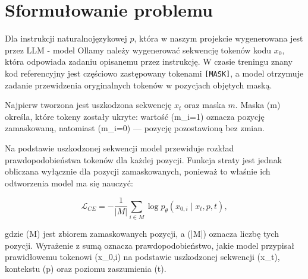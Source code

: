 \section{Sformułowanie problemu}
\label{sec:problem}

Dla instrukcji naturalnojęzykowej $p$, która w naszym projekcie wygenerowana jest przez LLM - model Ollamy należy wygenerować sekwencję tokenów kodu $x_0$, która odpowiada zadaniu opisanemu przez instrukcję.
W czasie treningu znany kod referencyjny jest częściowo zastępowany tokenami \texttt{[MASK]}, a model otrzymuje zadanie przewidzenia oryginalnych tokenów w pozycjach objętych maską.

Najpierw tworzona jest uszkodzona sekwencję $x_t$ oraz maska $m$.
Maska (m) określa, które tokeny zostały ukryte: wartość (m\_i=1) oznacza pozycję zamaskowaną, natomiast (m\_i=0) — pozycję pozostawioną bez zmian.

Na podstawie uszkodzonej sekwencji model przewiduje rozkład prawdopodobieństwa tokenów dla każdej pozycji.
Funkcja straty jest jednak obliczana wyłącznie dla pozycji zamaskowanych, ponieważ to właśnie ich odtworzenia model ma się nauczyć:


\begin{equation}
\label{eq:ce}
\mathcal{L}_{CE}
= -\frac{1}{|M|}\sum_{i\in M}\log p_\theta(x_{0,i}\mid x_t,p,t),
\end{equation}

gdzie (M) jest zbiorem zamaskowanych pozycji, a (|M|) oznacza liczbę tych pozycji.
Wyrażenie z sumą oznacza prawdopodobieństwo, jakie model przypisał prawidłowemu tokenowi (x\_{0,i}) na podstawie uszkodzonej sekwencji (x\_t), kontekstu (p) oraz poziomu zaszumienia (t).

